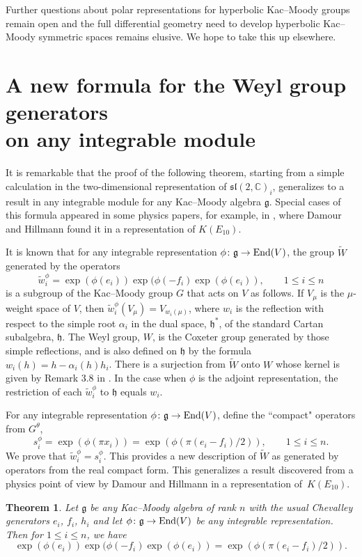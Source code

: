 \documentclass[pdftex]{sigma}
\numberwithin{equation}{section}
\newtheorem{Theorem}{Theorem}[section]
\def\C{{\mathbb C}}
\def\tW{{\widetilde{W}}}
\def\tw{{\widetilde{w}}}
\def\fg{\mathfrak{g}}
\def\fh{\mathfrak{h}}
\def\fsl{\mathfrak{sl}}
\begin{document}
Further questions about polar representations for hyperbolic Kac--Moody groups remain open and the full differential geometry need to develop hyperbolic Kac--Moody symmetric spaces remains elusive. We hope to take this up elsewhere.

\appendix
\section[A new formula for the Weyl group generators on any integrable module]{A new formula for the Weyl group generators\\ on any integrable module}

It is remarkable that the proof of the following theorem, starting from a simple calculation in the two-dimensional representation of
$\fsl(2,\C)_i$, generalizes to a result in any integrable module for any Kac--Moody algebra $\fg$. Special cases of this formula appeared
in some physics papers, for example, in \cite{DamourHillmann09}, where Damour and Hillmann found it in a representation of
$K(E_{10})$.

It is known \cite{Kac90} that for any integrable representation $\phi\colon \fg\to {\rm End}(V)$, the group $\tW$ generated by the operators
\[\tw_i^\phi = \exp(\phi(e_i)) \exp(\phi(-f_i) \exp(\phi(e_i)),\qquad 1\leq i\leq n\]
is a subgroup of the Kac--Moody group $G$ that acts on $V$ as follows. If $V_\mu$ is the $\mu$-weight space of $V$, then $\tw_i^\phi (V_\mu) = V_{w_i(\mu)}$, where $w_i$ is the reflection with respect to the simple root $\alpha_i$ in the dual space, $\fh^*$, of the standard Cartan subalgebra, $\fh$. The Weyl group, $W$, is the Coxeter group generated by those simple reflections, and is also defined on $\fh$ by the formula $w_i(h) = h - \alpha_i(h) h_i$. There is a surjection from $\tW$ onto $W$ whose kernel is given by Remark 3.8 in \cite{Kac90}. In the case when $\phi$ is the adjoint representation, the restriction of each $\tw_i^\phi$ to $\fh$ equals $w_i$.

For any integrable representation $\phi\colon \fg\to {\rm End}(V)$, define the ``compact" operators from $G^\theta$,
\[s_i^\phi = \exp(\phi(\pi x_i)) = \exp(\phi(\pi(e_i - f_i)/2)),\qquad 1\leq i\leq n.\]
We prove that $\tw_i^\phi = s_i^\phi$. This provides a new description of $\tW$ as generated by operators from the real compact form. This generalizes a result discovered from a physics point of view by Damour and Hillmann in a representation of~$K(E_{10})$.

\begin{Theorem}\label{theorem:newWeylFormula} Let $\fg$ be any Kac--Moody algebra of rank $n$ with the usual Chevalley generators $e_i$, $f_i$, $h_i$ and let $\phi\colon \fg\to {\rm End}(V)$ be any integrable representation. Then for $1\leq i\leq n$, we have
\[\exp(\phi(e_i)) \exp(\phi(-f_i) \exp(\phi(e_i)) = \exp(\phi(\pi(e_i - f_i)/2)).\]
\end{Theorem}
\end{document}

